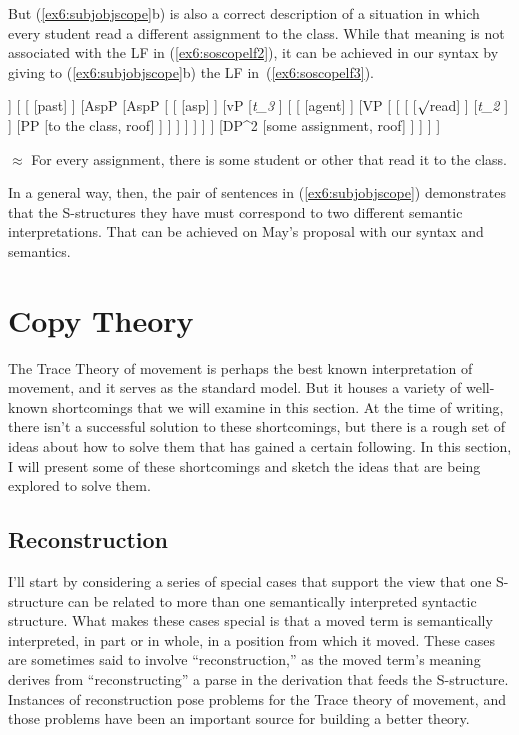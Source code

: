 But (\ref{ex6:subjobjscope}b) is also a correct description of a situation in which every student read a different assignment to the class. While that meaning is not associated with the LF in (\ref{ex6:soscopelf2}), it can be achieved in our syntax by giving to (\ref{ex6:subjobjscope}b) the LF in~(\ref{ex6:soscopelf3}).
\medskip
\begin{fullwidth}
\begin{exe}
\raggedright
	\ex \label{ex6:soscopelf3}
	\small
	\begin{forest}
	[TP
		[DP^3 [every student, roof] ]
		[
			[ [past] ]
			[AspP
				[AspP [
					[ [asp] ]
					[vP
						[\emph{t_3} ]
						[
							[ [agent] ]
							[VP [
								[
									[ [$\surd$read] ]
									[\emph{t_2} ]
								 ]
								[PP [to the class, roof] ]
							] ]
						 ]
					 ]
				] ]
				[DP^2 [some assignment, roof] ]
			 ]
		 ]
	]
	\end{forest}
	\sn $\approx$ For every assignment, there is some student or other that read it to the class.
\end{exe}
\end{fullwidth}
\medskip
In a general way, then, the pair of sentences in (\ref{ex6:subjobjscope}) demonstrates that the S-structures they have must correspond to two different semantic interpretations. That can be achieved on May's proposal with our syntax and semantics.

\section{Copy Theory}
\label{sec:copytheory}

The Trace Theory of movement is perhaps the best known interpretation of movement, and it serves as the standard model. But it houses a variety of well-known shortcomings that we will examine in this section. At the time of writing, there isn't a successful solution to these shortcomings, but there is a rough set of ideas about how to solve them that has gained a certain following. In this section, I will present some of these shortcomings and sketch the ideas that are being explored to solve them. 

\subsection{Reconstruction}
\label{sec:recon}

I'll start by considering a series of special cases that support the view that one S-structure can be related to more than one semantically interpreted syntactic structure. What makes these cases special is that a moved term is semantically interpreted, in part or in whole, in a position from which it moved. These cases are sometimes said to involve ``reconstruction,'' as the moved term's meaning derives from ``reconstructing'' a parse in the derivation that feeds the S-structure. Instances of reconstruction pose problems for the Trace theory of movement, and those problems have been an important source for building a better theory.

